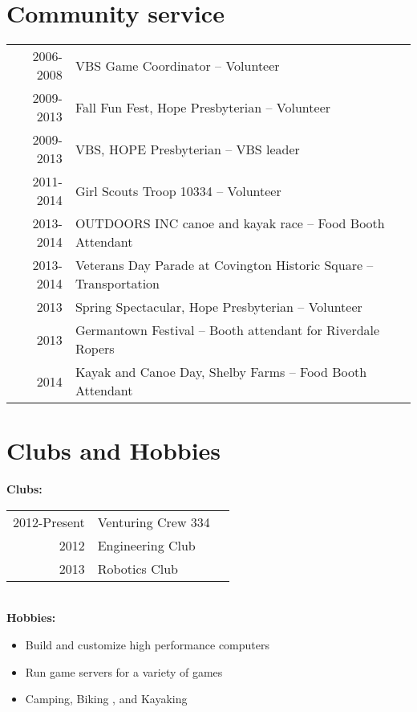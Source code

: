 \documentclass[letterpaper]{deedy-resume} %
\begin{document}
\begin{minipage}[t]{0.66\textwidth}
\begin{tabular}{rll}
\end{tabular}

\sectionspace %


\section{Community service} 

\begin{tabular}{rll}
2006-2008	& VBS Game Coordinator -- Volunteer \\
2009-2013	& Fall Fun Fest, Hope Presbyterian -- Volunteer  \\ 
2009-2013 & VBS, HOPE Presbyterian -- VBS leader \\
2011-2014	 & Girl Scouts Troop 10334 -- Volunteer \\
2013-2014	 & OUTDOORS INC canoe and kayak race -- Food Booth Attendant \\
2013-2014 & Veterans Day Parade at Covington Historic Square -- Transportation \\
2013	 & Spring Spectacular, Hope Presbyterian -- Volunteer \\
2013	 & Germantown Festival -- Booth attendant for Riverdale Ropers \\
2014	 	& Kayak and Canoe Day, Shelby Farms -- Food Booth Attendant \\




\end{tabular}

\sectionspace %

 \section{Clubs and Hobbies} 
 \textbf{Clubs:} \\
 \begin{tabular}{rll}
 2012-Present &Venturing Crew  334 \\
 2012 & Engineering Club \\
 2013 &Robotics Club \\
 
 
 \end{tabular} \\
 \textbf{Hobbies:} \\
 \begin{itemize}
\item  Build and customize high performance computers 
 \item Run game servers for a variety of games 
 \item Camping, Biking , and Kayaking 
 \end{itemize}
 
 


\sectionspace %



\end{minipage} %
\end{document}
